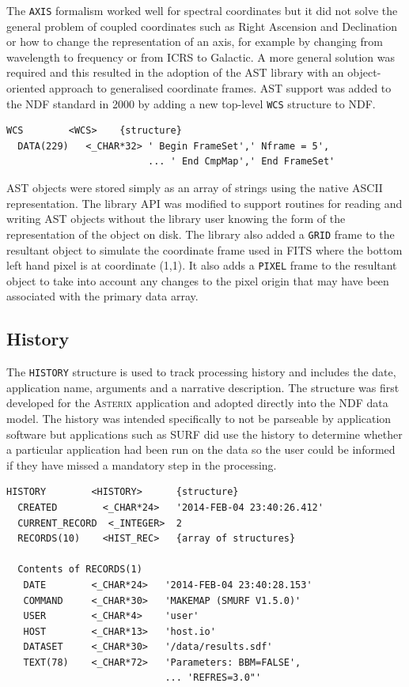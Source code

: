 \documentclass[final,authoryear,5p,times,twocolumn]{elsarticle}
\begin{document}
The \texttt{AXIS} formalism worked well for spectral coordinates but
it did not solve the general problem of coupled coordinates such as
Right Ascension and Declination or how to change the representation of
an axis, for example by changing from wavelength to frequency or from
ICRS to Galactic. A more general solution was required and this
resulted in the adoption of the AST library
\citep{1998ASPC..145...41W} with an object-oriented approach to
generalised coordinate frames. AST support was added to the NDF
standard in 2000 \citep{2001ASPC..238..129B} by adding a new top-level
\texttt{WCS} structure to NDF.

{\small
\begin{verbatim}
WCS        <WCS>    {structure}
  DATA(229)   <_CHAR*32> ' Begin FrameSet',' Nframe = 5',
                         ... ' End CmpMap',' End FrameSet'
\end{verbatim}
}

AST objects were stored simply as an array of strings using the native
ASCII representation. The library API was modified to support routines
for reading and writing AST objects without the library user knowing
the form of the representation of the object on disk. The library also
added a \texttt{GRID} frame to the resultant object to simulate the
coordinate frame used in FITS where the bottom left hand pixel is at
coordinate (1,1). It also adds a \texttt{PIXEL} frame to the resultant
object to take into account any changes to the pixel origin that may
have been associated with the primary data array.

\subsection{History}

The \texttt{HISTORY} structure is used to track processing history and
includes the date, application name, arguments and a narrative
description. The structure was first developed for the
\textsc{Asterix} application and adopted directly into the NDF data
model. The history was intended specifically to not be parseable by
application software but applications such as SURF
\citep{1998ASPC..145..216J} did use the history to determine whether a
particular application had been run on the data so the user could be
informed if they have missed a mandatory step in the processing.

{\small
\begin{verbatim}
HISTORY        <HISTORY>      {structure}
  CREATED        <_CHAR*24>   '2014-FEB-04 23:40:26.412'
  CURRENT_RECORD  <_INTEGER>  2
  RECORDS(10)    <HIST_REC>   {array of structures}

  Contents of RECORDS(1)
   DATE        <_CHAR*24>   '2014-FEB-04 23:40:28.153'
   COMMAND     <_CHAR*30>   'MAKEMAP (SMURF V1.5.0)'
   USER        <_CHAR*4>    'user'
   HOST        <_CHAR*13>   'host.io'
   DATASET     <_CHAR*30>   '/data/results.sdf'
   TEXT(78)    <_CHAR*72>   'Parameters: BBM=FALSE',
                            ... 'REFRES=3.0"'
\end{verbatim}
}
\end{document}

